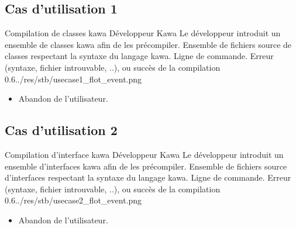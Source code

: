 \documentclass{../res/univ-projet}
\begin{document}
\subsection{Cas d'utilisation 1}
\ficheGraphic
{Compilation de classes kawa}                    %
{Développeur Kawa}                               %
{                                                %
  Le développeur introduit un ensemble de classes
  kawa afin de les précompiler.
}
{
	Ensemble de fichiers source de classes
	respectant la syntaxe du langage kawa. 
}                                                %
{Ligne de commande.}                             %
{Erreur (syntaxe, fichier introuvable, ..), ou 
 succès de la compilation}                       %
{0.6}{../res/stb/usecase1_flot_event.png} 		 %
{                                                %
  \begin{itemize}
  \item Abandon de l'utilisateur.
  \end{itemize}
}


\subsection{Cas d'utilisation 2}
\ficheGraphic
{Compilation d'interface kawa}                    %
{Développeur Kawa}                               %
{                                                %
  Le développeur introduit un ensemble d'interfaces
  kawa afin de les précompiler.
}
{
	Ensemble de fichiers source d'interfaces
	respectant la syntaxe du langage kawa. 
}                                                %
{Ligne de commande.}                             %
{Erreur (syntaxe, fichier introuvable, ..), ou 
 succès de la compilation}                       %
{0.6}{../res/stb/usecase2_flot_event.png} 		 %
{                                                %
  \begin{itemize}
  \item Abandon de l'utilisateur.
  \end{itemize}
}


\end{document}
